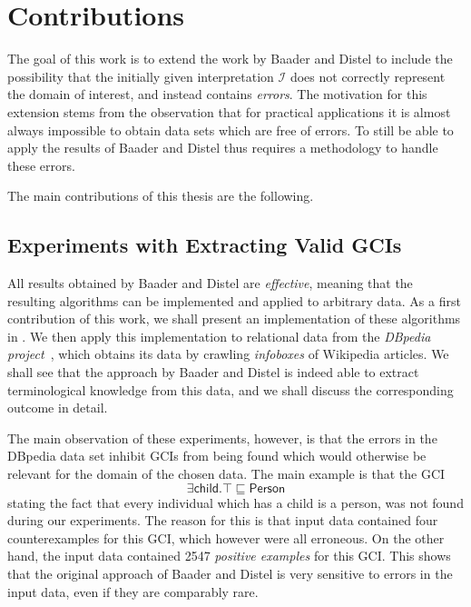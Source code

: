 \section{Contributions}
\label{sec:contributions}

The goal of this work is to extend the work by Baader and Distel to include the
possibility that the initially given interpretation $\mathcal{I}$ does not correctly
represent the domain of interest, and instead contains \emph{errors}.  The motivation for
this extension stems from the observation that for practical applications it is almost
always impossible to obtain data sets which are free of errors.  To still be able to apply
the results of Baader and Distel thus requires a methodology to handle these errors.

The main contributions of this thesis are the following.

\subsection{Experiments with Extracting Valid GCIs}
\label{sec:exper-with-extr}

All results obtained by Baader and Distel are \emph{effective}, meaning that the resulting
algorithms can be implemented and applied to arbitrary data.  As a first contribution of
this work, we shall present an implementation of these algorithms in
.  We then apply this implementation to relational data
from the \emph{DBpedia project}~\cite{DBpedia}, which obtains its data by crawling
\emph{infoboxes} of Wikipedia articles.  We shall see that the approach by Baader and
Distel is indeed able to extract terminological knowledge from this data, and we shall
discuss the corresponding outcome in detail.

The main observation of these experiments, however, is that the errors in the DBpedia data
set inhibit GCIs from being found which would otherwise be relevant for the domain of the
chosen data.  The main example is that the GCI
\begin{equation*}
  \exists \mathsf{child}. \top \sqsubseteq \mathsf{Person}
\end{equation*}
stating the fact that every individual which has a child is a person, was not found during
our experiments.  The reason for this is that input data contained four counterexamples
for this GCI, which however were all erroneous.  On the other hand, the input data
contained 2547 \emph{positive examples} for this GCI.  This shows that the original
approach of Baader and Distel is very sensitive to errors in the input data, even if they
are comparably rare.

